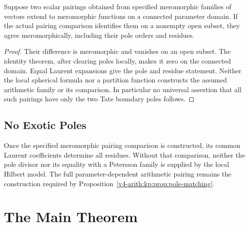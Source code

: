 \begin{proposition}
\label{v4-arith:kp:prop:pole-matching}
Suppose two scalar pairings obtained from specified meromorphic
families of vectors extend to meromorphic functions on a connected
parameter domain. If the actual pairing comparison identifies them
on a nonempty open subset, they agree meromorphically, including
their pole orders and residues.
\end{proposition}
\begin{proof}
Their difference is meromorphic and vanishes on an open subset.
The identity theorem, after clearing poles locally, makes it zero
on the connected domain. Equal Laurent expansions give the pole
and residue statement. Neither the local spherical formula nor a
partition function constructs the assumed arithmetic family or its
comparison. In particular no universal assertion that all such
pairings have only the two Tate boundary poles follows.
\end{proof}

\subsection{No Exotic Poles}
\label{v4-arith:kp:analytic-cont:no-exotic}

\begin{remark}
\label{v4-arith:kp:rem:no-new-residue}
Once the specified meromorphic pairing comparison is constructed,
its common Laurent coefficients determine all residues. Without
that comparison, neither the pole divisor nor its equality with a
Petersson family is supplied by the local Hilbert model. The full
parameter-dependent arithmetic pairing remains the construction
required by Proposition~\ref{v4-arith:kp:prop:pole-matching}.
\end{remark}

\section{The Main Theorem}
\label{v4-arith:kp:main-theorem}


